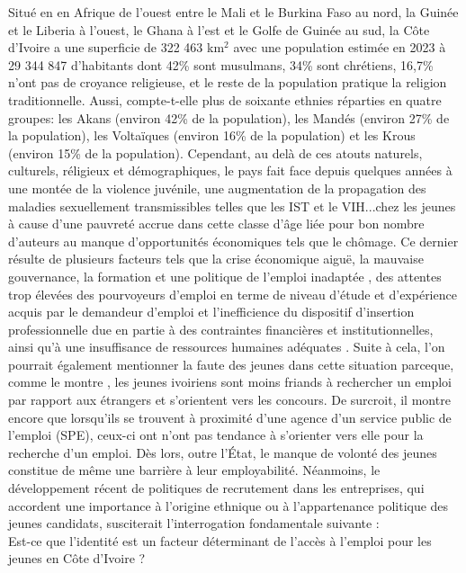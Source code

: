 \documentclass[12pt,a4paper, openany]{book}
\begin{document}
\noindent Situé en en Afrique de l'ouest entre le Mali et le Burkina Faso au nord, la Guinée et le Liberia à l'ouest, le Ghana à l'est et le Golfe de Guinée au sud, la Côte d'Ivoire a une superficie de 322 463 km$^2$ avec une population estimée en 2023 à 29 344 847 d’habitants dont 42\% sont musulmans, 34\% sont chrétiens, 16,7\% n’ont pas de croyance religieuse, et le reste de la population pratique la religion traditionnelle. Aussi, compte-t-elle plus de soixante ethnies réparties en quatre groupes: les Akans (environ 42\% de la population), les Mandés (environ 27\% de la population), les Voltaïques (environ 16\% de la population) et les Krous (environ 15\% de la population). Cependant, au delà de ces atouts naturels, culturels, réligieux et démographiques, le pays fait face depuis quelques années à une montée de la violence juvénile, une augmentation de la propagation des maladies sexuellement transmissibles telles que les IST et le VIH...chez les jeunes à cause d'une pauvreté accrue dans cette classe d'âge liée pour bon nombre d'auteurs au manque d'opportunités économiques tels que le chômage. Ce dernier résulte de plusieurs facteurs tels que la crise économique aiguë, la mauvaise gouvernance, la formation et une politique de l’emploi inadaptée \parencite{simeon2018jeunes}, des attentes trop élevées des pourvoyeurs d'emploi en terme de niveau d'étude et d'expérience acquis par le demandeur d'emploi et l’inefficience du dispositif d’insertion professionnelle due en partie à des contraintes financières et institutionnelles, ainsi qu’à une insuffisance de ressources humaines adéquates \parencite{n2015employabilite}. Suite à cela, l'on pourrait également mentionner la faute des jeunes dans cette situation parceque, comme le montre \textcite{n2015analyse}, les jeunes ivoiriens sont moins friands à rechercher un emploi par rapport aux étrangers et s'orientent vers les concours. De surcroit, il montre encore que lorsqu'ils se trouvent à proximité d'une agence d’un service public de l’emploi (SPE), ceux-ci ont n'ont pas tendance à s'orienter vers elle pour la recherche d'un emploi. Dès lors, outre l'\'Etat, le manque de volonté des jeunes constitue de même une barrière à leur employabilité. Néanmoins, le développement récent de politiques de recrutement dans les entreprises, qui accordent une importance à l'origine ethnique ou à l'appartenance politique des jeunes candidats, susciterait l'interrogation fondamentale suivante :\\

Est-ce que l'identité est un facteur déterminant de l'accès à l'emploi pour les jeunes en Côte d'Ivoire ?\\
\end{document}
